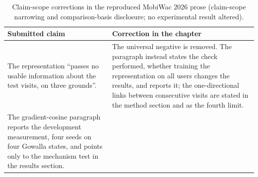 \begin{table}[htb]
\caption{Claim-scope corrections in the reproduced MobiWac 2026 prose (claim-scope
narrowing and comparison-basis disclosure; no experimental result altered).}
\label{tab:apx:mobiwac-scope}
\centering
\small
\begin{tabular}{@{}p{}p{}@{}}
\toprule
\textbf{Submitted claim} & \textbf{Correction in the chapter} \\
\midrule
The representation ``passes no usable information about the test visits, on three
grounds''. &
The universal negative is removed. The paragraph instead states the check performed, whether
training the representation on all users changes the results, and reports it; the
one-directional links between consecutive visits are stated in the method section and as the
fourth limit. \\
\addlinespace
The gradient-cosine paragraph reports the development measurement, four seeds on four
Gowalla states, and points only to the mechanism test in the results section. &

\end{tabular}
\end{table}
